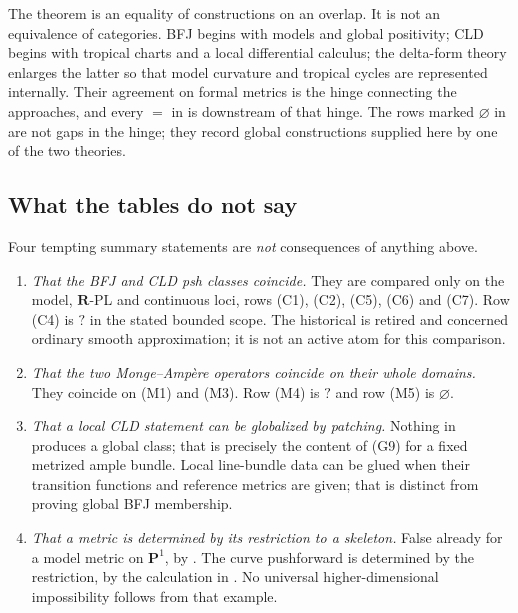 \begin{remark}
\label{rem:ch31-not-an-equivalence}
The theorem is an equality of constructions on an overlap.  It is not an
equivalence of categories.  BFJ begins with models and global positivity;
CLD begins with tropical charts and a local differential calculus; the
delta-form theory enlarges the latter so that model curvature and tropical
cycles are represented internally.  Their agreement on formal metrics is
the hinge connecting the approaches, and every $=$ in
 is downstream of that hinge.  The rows marked
$\varnothing$ in  are not gaps in the hinge;
they record global constructions supplied here by one of the two theories.
\end{remark}

\subsection{What the tables do not say}
\label{sec:ch31-table-not}

Four tempting summary statements are \emph{not} consequences of anything
above.

\begin{enumerate}
\item\label{itm:ch31-not:classes}
 \emph{That the BFJ and CLD psh classes coincide.}  They are compared only on the model, $\mathbf R$-PL and continuous loci,
rows (C1), (C2), (C5), (C6) and (C7).  Row (C4)
 is $?$ in the stated bounded scope.  The historical
  is retired and concerned ordinary
 smooth approximation; it is not an active atom for this comparison.
\item\label{itm:ch31-not:operators}
 \emph{That the two Monge--Amp\`ere operators coincide on their whole
 domains.}  They coincide on (M1) and (M3).  Row (M4) is $?$ and row
 (M5) is $\varnothing$.
\item\label{itm:ch31-not:local}
 \emph{That a local CLD statement can be globalized by patching.}  Nothing
 in  produces a global class; that is precisely the content
 of (G9) for a fixed metrized ample bundle.  Local line-bundle data can
 be glued when their transition functions and reference metrics are given;
 that is distinct from proving global BFJ membership.
\item\label{itm:ch31-not:skeleton}
 \emph{That a metric is determined by its restriction to a skeleton.}
 False already for a model metric on $\mathbf P^1$, by
 .  The curve pushforward is determined by
 the restriction, by the calculation in .  No universal
 higher-dimensional impossibility follows from that example.
\end{enumerate}

